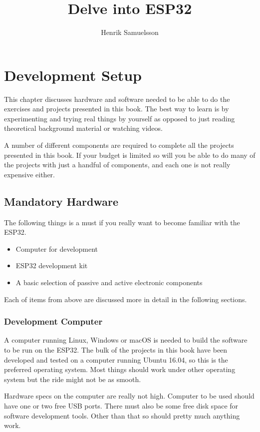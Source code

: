 \documentclass{tufte-book}
\title{Delve into ESP32}
\author{Henrik Samuelsson}
\begin{document}
	\maketitle
	
	\cleardoublepage
	\chapter*{Development Setup}
	
	This chapter discusses hardware and software needed to be able to do the exercises and projects presented in this book. The best way to learn is by experimenting and trying real things by yourself as opposed to just reading theoretical background material or watching videos.
	
	A number of different components are required to complete all the projects presented in this book. If your budget is limited so will you be  able to do many of the projects with just a handful of components, and each one is not really expensive either.
	
	\section{Mandatory Hardware}\label{sec:hardware}
	The following things is a must if you really want to become familiar with the ESP32.
	
	\begin{itemize}
		\item Computer for development
		\item ESP32 development kit
		\item A basic selection of passive and active electronic components
	\end{itemize}
	
	Each of items from above are discussed more in detail in the following sections.
	
	\subsection{Development Computer}
	A computer running Linux, Windows or macOS is needed to build the software to be run on the ESP32. The bulk of the projects in this book have been developed and tested on a computer running Ubuntu 16.04, so this is the preferred operating system. Most things should work under other operating system but the ride might not be as smooth.
	
	Hardware specs on the computer are really not high. Computer to be used should have one or two free USB ports. There must also be some free disk space for software development tools. Other than that so should pretty much anything work.
	
\end{document}
